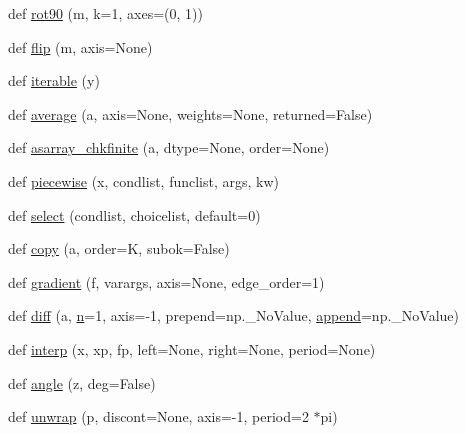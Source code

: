 \begin{DoxyCompactItemize}
\item 
def \hyperlink{namespacenumpy_1_1lib_1_1function__base_ae7e26dce00db8f70ff62cbe0502a9d32}{rot90} (m, k=1, axes=(0, 1))
\item 
def \hyperlink{namespacenumpy_1_1lib_1_1function__base_ab1ffa989c13eca5fda1c75cf8494d9d2}{flip} (m, axis=None)
\item 
def \hyperlink{namespacenumpy_1_1lib_1_1function__base_a368079157e5bbf6d150b0180349244e8}{iterable} (y)
\item 
def \hyperlink{namespacenumpy_1_1lib_1_1function__base_aa761010465aba3da29779545b3692af5}{average} (a, axis=None, weights=None, returned=False)
\item 
def \hyperlink{namespacenumpy_1_1lib_1_1function__base_a9436e843598930a32c1b0e4fd7cbda86}{asarray\+\_\+chkfinite} (a, dtype=None, order=None)
\item 
def \hyperlink{namespacenumpy_1_1lib_1_1function__base_a91e594cc6c10d304c1d5044ba291d48e}{piecewise} (x, condlist, funclist, args, kw)
\item 
def \hyperlink{namespacenumpy_1_1lib_1_1function__base_add02c0e2aaaa517ff2b593caa51ffbab}{select} (condlist, choicelist, default=0)
\item 
def \hyperlink{namespacenumpy_1_1lib_1_1function__base_aa46553d3b1207934de95320186e6d9f5}{copy} (a, order=\textquotesingle{}K\textquotesingle{}, subok=False)
\item 
def \hyperlink{namespacenumpy_1_1lib_1_1function__base_a88404e4a9227049d8c2a36c4ea8d0a19}{gradient} (f, varargs, axis=None, edge\+\_\+order=1)
\item 
def \hyperlink{namespacenumpy_1_1lib_1_1function__base_a2dac0aee3f8e493997dd21a4ab61a443}{diff} (a, \hyperlink{namespacenumpy_a352663c52853d2754274407d5cae2832}{n}=1, axis=-\/1, prepend=np.\+\_\+\+No\+Value, \hyperlink{namespacenumpy_1_1lib_1_1function__base_a3d2c28a02f8e243ec2d9ed603c93333f}{append}=np.\+\_\+\+No\+Value)
\item 
def \hyperlink{namespacenumpy_1_1lib_1_1function__base_ab90151ca1ca87c31bc09a413515feba3}{interp} (x, xp, fp, left=None, right=None, period=None)
\item 
def \hyperlink{namespacenumpy_1_1lib_1_1function__base_affa486089c1232add7523d4077b28652}{angle} (z, deg=False)
\item 
def \hyperlink{namespacenumpy_1_1lib_1_1function__base_a4507dc3e7ce566a616df18466d1b5994}{unwrap} (p, discont=None, axis=-\/1, period=2 $\ast$pi)
\item 

\end{DoxyCompactItemize}
